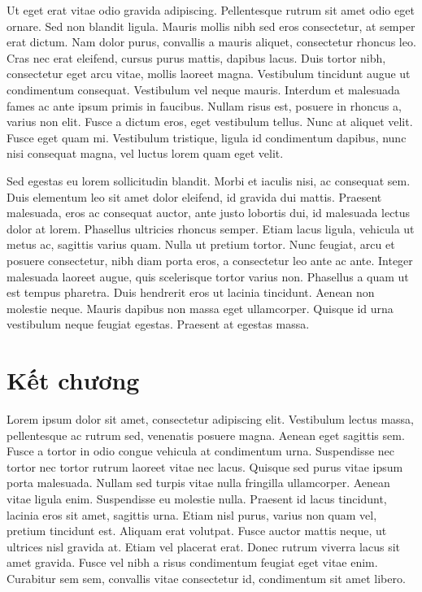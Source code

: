 Ut eget erat vitae odio gravida adipiscing. Pellentesque rutrum sit amet odio eget ornare. Sed non blandit ligula. Mauris mollis nibh sed eros consectetur, at semper erat dictum. Nam dolor purus, convallis a mauris aliquet, consectetur rhoncus leo. Cras nec erat eleifend, cursus purus mattis, dapibus lacus. Duis tortor nibh, consectetur eget arcu vitae, mollis laoreet magna. Vestibulum tincidunt augue ut condimentum consequat. Vestibulum vel neque mauris. Interdum et malesuada fames ac ante ipsum primis in faucibus. Nullam risus est, posuere in rhoncus a, varius non elit. Fusce a dictum eros, eget vestibulum tellus. Nunc at aliquet velit. Fusce eget quam mi. Vestibulum tristique, ligula id condimentum dapibus, nunc nisi consequat magna, vel luctus lorem quam eget velit.

Sed egestas eu lorem sollicitudin blandit. Morbi et iaculis nisi, ac consequat sem. Duis elementum leo sit amet dolor eleifend, id gravida dui mattis. Praesent malesuada, eros ac consequat auctor, ante justo lobortis dui, id malesuada lectus dolor at lorem. Phasellus ultricies rhoncus semper. Etiam lacus ligula, vehicula ut metus ac, sagittis varius quam. Nulla ut pretium tortor. Nunc feugiat, arcu et posuere consectetur, nibh diam porta eros, a consectetur leo ante ac ante. Integer malesuada laoreet augue, quis scelerisque tortor varius non. Phasellus a quam ut est tempus pharetra. Duis hendrerit eros ut lacinia tincidunt. Aenean non molestie neque. Mauris dapibus non massa eget ullamcorper. Quisque id urna vestibulum neque feugiat egestas. Praesent at egestas massa.

\section{Kết chương}
Lorem ipsum dolor sit amet, consectetur adipiscing elit. Vestibulum lectus massa, pellentesque ac rutrum sed, venenatis posuere magna. Aenean eget sagittis sem. Fusce a tortor in odio congue vehicula at condimentum urna. Suspendisse nec tortor nec tortor rutrum laoreet vitae nec lacus. Quisque sed purus vitae ipsum porta malesuada. Nullam sed turpis vitae nulla fringilla ullamcorper. Aenean vitae ligula enim. Suspendisse eu molestie nulla. Praesent id lacus tincidunt, lacinia eros sit amet, sagittis urna. Etiam nisl purus, varius non quam vel, pretium tincidunt est. Aliquam erat volutpat. Fusce auctor mattis neque, ut ultrices nisl gravida at. Etiam vel placerat erat. Donec rutrum viverra lacus sit amet gravida. Fusce vel nibh a risus condimentum feugiat eget vitae enim. Curabitur sem sem, convallis vitae consectetur id, condimentum sit amet libero.


